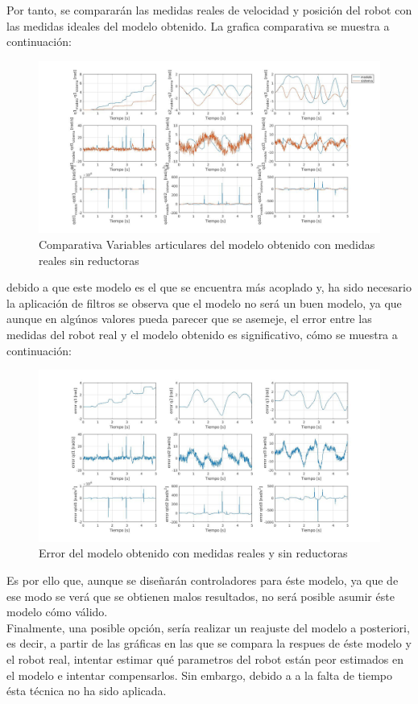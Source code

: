 Por tanto, se compararán las medidas reales de velocidad y posición del robot con las medidas ideales del modelo obtenido. La grafica comparativa se muestra a continuación:

\begin{figure}[h!]
	\centering
	\includegraphics[width=.7\textwidth]{EstimacParam_SisMod_In1_RealSR}
	\caption{Comparativa Variables articulares del modelo obtenido con medidas reales sin reductoras}
\end{figure}

\newpage
debido a que este modelo es el que se encuentra más acoplado y, ha sido necesario la aplicación de filtros se observa que el modelo no será un buen modelo, ya que aunque en algúnos valores pueda parecer que se asemeje, el error entre las medidas del robot real y el modelo obtenido es significativo, cómo se muestra a continuación:

\begin{figure}[h!]
	\centering
	\includegraphics[width=1\textwidth]{EstimacParam_SisModError_In1_RealSR}
	\caption{Error del modelo obtenido con medidas reales y sin reductoras}
\end{figure}

Es por ello que, aunque se diseñarán controladores para éste modelo, ya que de ese modo se verá que se obtienen malos resultados, no será posible asumir éste modelo cómo válido.\\
Finalmente, una posible opción, sería realizar un reajuste del modelo a posteriori, es decir, a partir de las gráficas en las que se compara la respues de éste modelo y el robot real, intentar estimar qué parametros del robot están peor estimados en el modelo e intentar compensarlos. Sin embargo, debido a a la falta de tiempo ésta técnica no ha sido aplicada.

